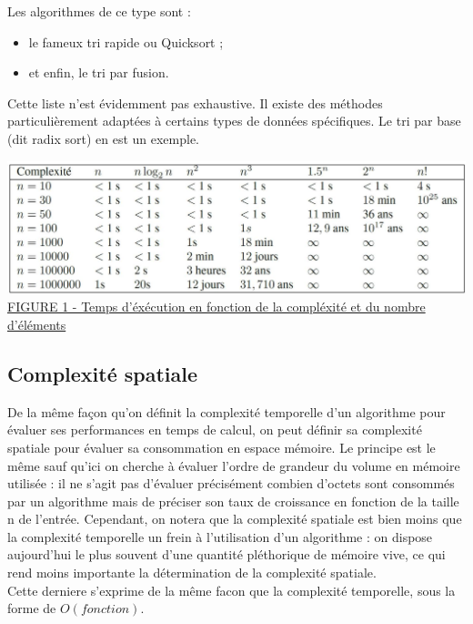 \documentclass[11pt,a4paper]{article}
\begin{document}
\begin{itemize}
          Les algorithmes de ce type sont :
          \begin{itemize}

              \item le fameux tri rapide ou Quicksort ;
              \item et enfin, le tri par fusion.
          \end{itemize}
          \vspace{0.1cm}

          Cette liste n’est évidemment pas exhaustive. Il existe des méthodes particulièrement adaptées à certains types de données spécifiques.
          Le tri par base (dit radix sort) en est un exemple.

          \vspace{0.5cm}

          \includegraphics[scale = 0.5]{Images/O(n).jpg}
          \underline {FIGURE 1 - Temps d'éxécution en fonction de la compléxité et du nombre d'éléments}


\end{itemize}

\subsection{Complexité spatiale}
De la même façon qu’on définit la complexité temporelle d’un algorithme pour évaluer ses performances en
temps de calcul, on peut définir sa complexité spatiale pour évaluer sa consommation en espace mémoire. Le
principe est le même sauf qu’ici on cherche à évaluer l’ordre de grandeur du volume en mémoire utilisée : il
ne s’agit pas d’évaluer précisément combien d’octets sont consommés par un algorithme mais de préciser son
taux de croissance en fonction de la taille n de l’entrée. Cependant, on notera que la complexité spatiale est
bien moins que la complexité temporelle un frein à l’utilisation d’un algorithme : on dispose aujourd’hui le
plus souvent d’une quantité pléthorique de mémoire vive, ce qui rend moins importante la détermination de la
complexité spatiale.\\
Cette derniere s'exprime de la même facon que la complexité temporelle, sous la forme de $\displaystyle{O(fonction)}$.
\end{document}
